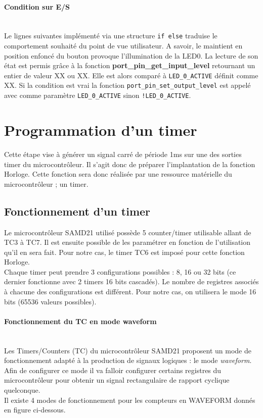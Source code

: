 \documentclass[a4paper]{article}
\begin{document}
\paragraph{Condition sur E/S}
~~\\
Le lignes suivantes implémenté via une structure \texttt{if else} traduise le comportement souhaité du point de vue utilisateur. A savoir, le maintient en position enfoncé du bouton provoque l'illumination de la LED0. La lecture de son état est permis grâce à la fonction \textbf{port\_pin\_get\_input\_level} retournant un entier de valeur XX ou XX. Elle est alors comparé à \texttt{LED\_0\_ACTIVE} définit comme XX. Si la condition est vrai la fonction \texttt{port\_pin\_set\_output\_level} est appelé avec comme paramètre \texttt{LED\_0\_ACTIVE} sinon \texttt{!LED\_0\_ACTIVE}.

\section{Programmation d'un timer}
Cette étape vise à générer un signal carré de période 1ms sur une des sorties timer du microcontrôleur. Il s'agit donc de préparer l'implantation de la fonction Horloge. Cette fonction sera donc réalisée par une ressource matérielle du microcontrôleur ; un timer.
\subsection{Fonctionnement d'un timer}
Le microcontrôleur SAMD21 utilisé possède 5 counter/timer utilisable allant de TC3 à TC7. Il est ensuite possible de les paramétrer en fonction de l’utilisation qu’il en sera fait. Pour notre cas, le timer TC6 est imposé pour cette fonction Horloge.\\
Chaque timer peut prendre 3 configurations possibles : 8, 16 ou 32 bits (ce dernier fonctionne avec 2 timers 16 bits cascadés). Le nombre de registres associés à chacune des configurations est différent. Pour notre cas, on utilisera le mode 16 bits (65536 valeurs possibles).  \\
\paragraph{Fonctionnement du TC en mode waveform}
~~\\
Les Timers/Counters (TC) du microcontrôleur SAMD21 proposent un mode de fonctionnement adapté à la production de signaux logiques : le mode {\sl waveform}. Afin de configurer ce mode il va falloir configurer certains registres du microcontrôleur pour obtenir un signal rectangulaire de rapport cyclique quelconque. \\
Il existe 4 modes de fonctionnement pour les compteurs en WAVEFORM donnés en figure ci-dessous. \\
\end{document}
